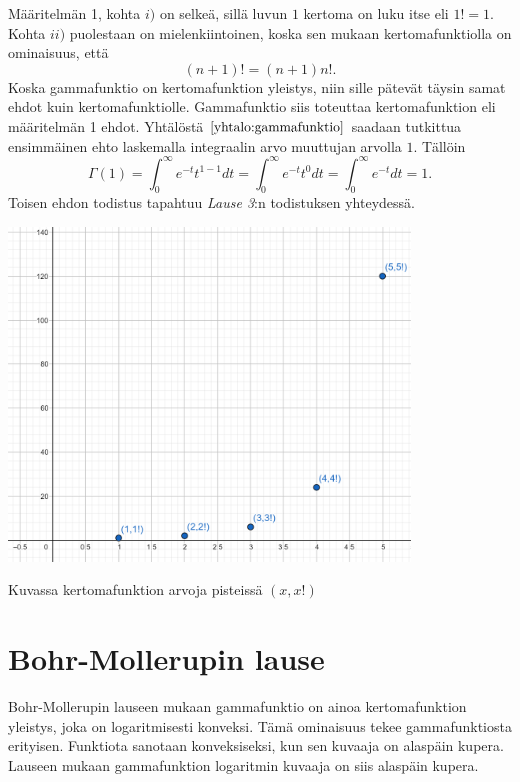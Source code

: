 \documentclass[12pt]{article}
\theoremstyle{definition}
\theoremstyle{plain}
\numberwithin{equation}{section}
\begin{document}
Määritelmän 1, kohta $i)$ on selkeä, sillä luvun $1$ kertoma on luku itse eli $1!=1$. Kohta $ii)$ puolestaan on mielenkiintoinen, koska sen mukaan kertomafunktiolla on ominaisuus, että 
\begin{equation}
    (n+1)! = (n+1)n!.
\end{equation}
Koska gammafunktio on kertomafunktion yleistys, niin sille pätevät täysin samat ehdot kuin kertomafunktiolle. Gammafunktio siis toteuttaa kertomafunktion eli määritelmän 1 ehdot. Yhtälöstä $\eqref{yhtalo:gammafunktio}$ saadaan tutkittua ensimmäinen ehto laskemalla integraalin arvo muuttujan arvolla $1$. Tällöin
\begin{equation*}
    \Gamma(1)=\int_0^\infty e^{-t}t^{1-1}dt=\int_0^\infty e^{-t}t^{0}dt = \int_0^\infty e^{-t}dt = 1.
\end{equation*}
Toisen ehdon todistus tapahtuu \emph{Lause 3}:n todistuksen yhteydessä.
\begin{center}
\includegraphics[width=0.8\textwidth]{kertomakuva.png} \newline
\caption{Kuvassa kertomafunktion arvoja pisteissä $(x,x!)$}
\end{center}

\newpage

\section{Bohr-Mollerupin lause}
\onehalfspacing
Bohr-Mollerupin lauseen mukaan gammafunktio on ainoa kertomafunktion yleistys, joka on logaritmisesti konveksi. Tämä ominaisuus tekee gammafunktiosta erityisen. Funktiota sanotaan konveksiseksi, kun sen kuvaaja on alaspäin kupera. Lauseen mukaan gammafunktion logaritmin kuvaaja on siis alaspäin kupera.
\newline
\end{document}
